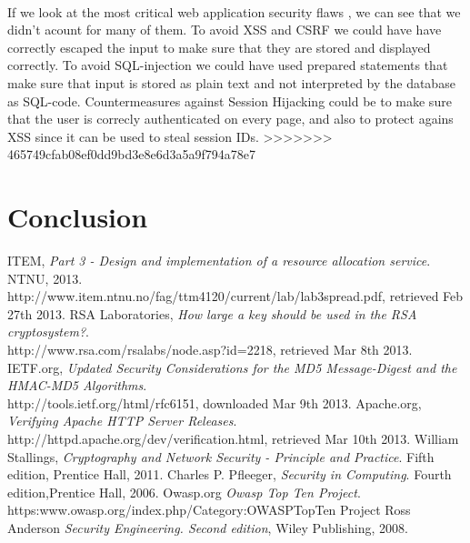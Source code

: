 \documentclass[a4paper,11pt]{article}
\begin{document}
\paragraph{}If we look at the most critical web application security flaws \cite{7}, we can see that we didn't acount for many of them. To avoid XSS and CSRF we could have have correctly escaped the input to make sure that they are stored and displayed correctly. To avoid SQL-injection we could have used prepared statements that make sure that input is stored as plain text and not interpreted by the database as SQL-code. Countermeasures against Session Hijacking could be to make sure that the user is correcly authenticated on every page, and also to protect agains XSS since it can be used to steal session IDs.
>>>>>>> 465749cfab08ef0dd9bd3e8e6d3a5a9f794a78e7
\section*{Conclusion}
\begin{thebibliography}{9}
ITEM, 
	\emph{Part 3 - Design and implementation of a resource allocation service}.
	NTNU, 2013. \\http://www.item.ntnu.no/fag/ttm4120/current/lab/lab3spread.pdf, retrieved Feb 27th 2013.
RSA Laboratories, \emph{How large a key should be used in the RSA cryptosystem?}.\\ http://www.rsa.com/rsalabs/node.asp?id=2218, retrieved Mar 8th 2013.	
IETF.org, \emph{Updated Security Considerations for the MD5 Message-Digest and the HMAC-MD5 Algorithms}.\\ http://tools.ietf.org/html/rfc6151, downloaded Mar 9th 2013.
 Apache.org, \emph{Verifying Apache HTTP Server Releases}.\\ http://httpd.apache.org/dev/verification.html, retrieved Mar 10th 2013.
William Stallings, \emph{Cryptography and Network Security - Principle and Practice}. Fifth edition, Prentice Hall, 2011.
Charles P. Pfleeger, \emph{Security in Computing}. Fourth edition,Prentice Hall, 2006.
Owasp.org \emph{Owasp Top Ten Project}.\\ https:www.owasp.org/index.php/Category:OWASP\textunderscore Top\textunderscore Ten \textunderscore Project
Ross Anderson \emph{Security Engineering. Second edition}, Wiley Publishing, 2008.
\end{thebibliography}
\listoffigures
\end{document}
